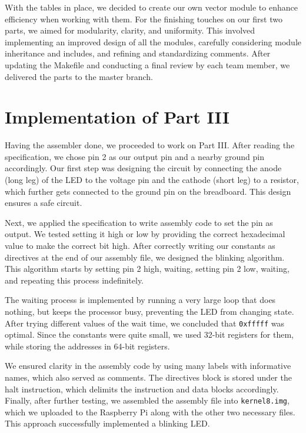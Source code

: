 \documentclass{article}
\begin{document}
With the tables in place, we decided to create our own vector module to enhance efficiency when working with them. For the finishing touches on our first two parts, we aimed for modularity, clarity, and uniformity. This involved implementing an improved design of all the modules, carefully considering module inheritance and includes, and refining and standardizing comments. After updating the Makefile and conducting a final review by each team member, we delivered the parts to the master branch.

 
\section{Implementation of Part III}

Having the assembler done, we proceeded to work on Part III. After reading the specification, we chose pin 2 as our output pin and a nearby ground pin accordingly. Our first step was designing the circuit by connecting the anode (long leg) of the LED to the voltage pin and the cathode (short leg) to a resistor, which further gets connected to the ground pin on the breadboard. This design ensures a safe circuit.

Next, we applied the specification to write assembly code to set the pin as output. We tested setting it high or low by providing the correct hexadecimal value to make the correct bit high. After correctly writing our constants as directives at the end of our assembly file, we designed the blinking algorithm. This algorithm starts by setting pin 2 high, waiting, setting pin 2 low, waiting, and repeating this process indefinitely.

The waiting process is implemented by running a very large loop that does nothing, but keeps the processor busy, preventing the LED from changing state. After trying different values of the wait time, we concluded that \texttt{0xfffff} was optimal. Since the constants were quite small, we used 32-bit registers for them, while storing the addresses in 64-bit registers.

We ensured clarity in the assembly code by using many labels with informative names, which also served as comments. The directives block is stored under the halt instruction, which delimits the instruction and data blocks accordingly. Finally, after further testing, we assembled the assembly file into \texttt{kernel8.img}, which we uploaded to the Raspberry Pi along with the other two necessary files. This approach successfully implemented a blinking LED.
\end{document}
